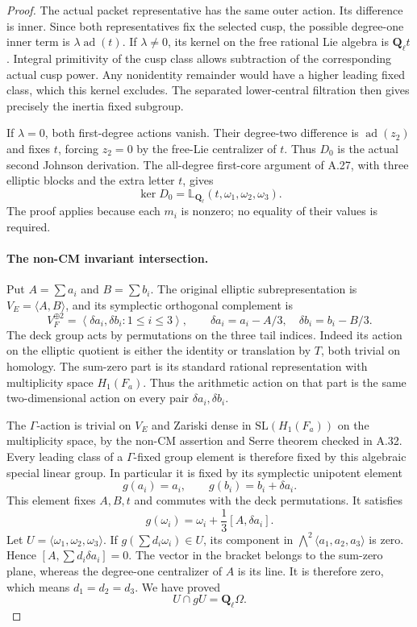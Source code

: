 \begin{proof}
The actual packet representative has the same
outer action. Its difference is inner. Since
both representatives fix the selected cusp,
the possible degree-one inner term is
$\lambda\operatorname{ad}(t)$. If $\lambda\ne0$,
its kernel on the free rational Lie algebra is
$\mathbf Q_\ell t$. Integral primitivity of
the cusp class allows subtraction of the
corresponding actual cusp power. Any nonidentity
remainder would have a higher leading fixed
class, which this kernel excludes. The separated
lower-central filtration then gives precisely
the inertia fixed subgroup.

If $\lambda=0$, both first-degree actions vanish.
Their degree-two difference is
$\operatorname{ad}(z_2)$ and fixes $t$, forcing
$z_2=0$ by the free-Lie centralizer of $t$.
Thus $D_0$ is the actual second Johnson
derivation. The all-degree first-core argument
of A.27, with three elliptic blocks and the
extra letter $t$, gives
\[
 \ker D_0=\mathbb L_{\mathbf Q_\ell}
                      (t,\omega_1,\omega_2,\omega_3).
\]
The proof applies because each $m_i$ is nonzero;
no equality of their values is required.

\paragraph{The non-CM invariant intersection.}
Put $A=\sum a_i$ and $B=\sum b_i$.
The original elliptic subrepresentation is
$V_E=\langle A,B\rangle$, and its symplectic
orthogonal complement is
\[
 V_F^{\oplus2}
   =\left\langle \delta a_i,\delta b_i:1\le i\le3\right\rangle,
 \qquad
 \delta a_i=a_i-A/3,\quad \delta b_i=b_i-B/3.
\]
The deck group acts by permutations on the
three tail indices. Indeed its action on the
elliptic quotient is either the identity or
translation by $T$, both trivial on homology.
The sum-zero part is its standard rational
representation with multiplicity space
$H_1(F_a)$. Thus the arithmetic action on
that part is the same two-dimensional action
on every pair $\delta a_i,\delta b_i$.

The $\Gamma$-action is trivial on $V_E$ and
Zariski dense in $\mathrm{SL}(H_1(F_a))$ on
the multiplicity space, by the non-CM assertion
and Serre theorem checked in A.32. Every
leading class of a $\Gamma$-fixed group
element is therefore fixed by this algebraic
special linear group. In particular it is
fixed by its symplectic unipotent element
\[
 g(a_i)=a_i,\qquad
 g(b_i)=b_i+\delta a_i.
\]
This element fixes $A,B,t$ and commutes with
the deck permutations. It satisfies
\[
 g(\omega_i)=\omega_i+\frac13[A,\delta a_i].
\]
Let $U=\langle\omega_1,\omega_2,\omega_3\rangle$.
If $g(\sum d_i\omega_i)\in U$, its component
in $\bigwedge^2\langle a_1,a_2,a_3\rangle$
is zero. Hence $[A,\sum d_i\delta a_i]=0$.
The vector in the bracket belongs to the
sum-zero plane, whereas the degree-one
centralizer of $A$ is its line. It is
therefore zero, which means $d_1=d_2=d_3$.
We have proved
\[
                         U\cap gU=\mathbf Q_\ell\Omega.
\]


\end{proof}
